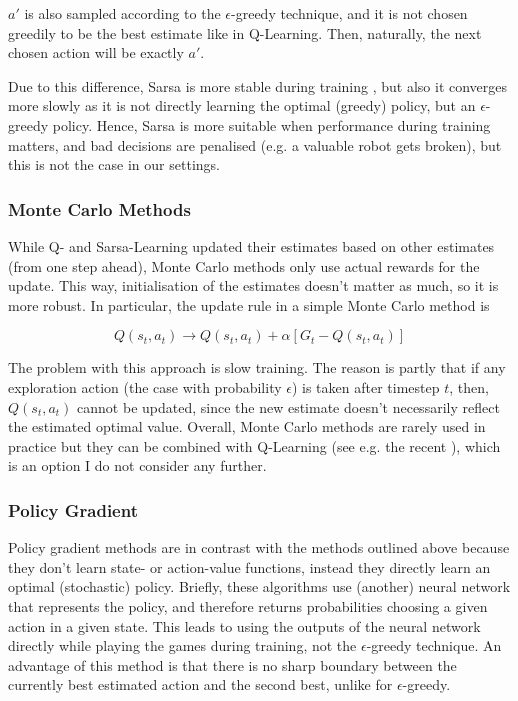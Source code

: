 $a'$ is also sampled according to the $\epsilon$-greedy technique, and it is not chosen greedily to be the best estimate like in Q-Learning. Then, naturally, the next chosen action will be exactly $a'$.

Due to this difference, Sarsa is more stable during training , but also it converges more slowly as it is not directly learning the optimal (greedy) policy, but an $\epsilon$-greedy policy. Hence, Sarsa is more suitable when performance during training matters, and bad decisions are penalised (e.g. a valuable robot gets broken), but this is not the case in our settings.

\subsubsection{Monte Carlo Methods}


While Q- and Sarsa-Learning updated their estimates based on other estimates (from one step ahead), Monte Carlo methods only use actual rewards for the update. This way, initialisation of the estimates doesn't matter as much, so it is more robust. In particular, the update rule in a simple Monte Carlo method is

\begin{equation} \label{eq:monte-carloUpdate}
Q(s_t,a_t) \longrightarrow Q(s_t,a_t) + \alpha[G_t - Q(s_t,a_t)]
\end{equation}

The problem with this approach is slow training. The reason is partly that if any exploration action (the case with probability $\epsilon$) is taken after timestep $t$, then, $Q(s_t,a_t)$ cannot be updated, since the new estimate doesn't necessarily reflect the estimated optimal value. Overall, Monte Carlo methods are rarely used in practice but they can be combined with Q-Learning (see e.g. the recent \cite{wang2018montecarloqlearning}), which is an option I do not consider any further.

\subsubsection{Policy Gradient}

Policy gradient methods are in contrast with the methods outlined above because they don't learn state- or action-value functions, instead they directly learn an optimal (stochastic) policy. Briefly, these algorithms use (another) neural network that represents the policy, and therefore returns probabilities choosing a given action in a given state. This leads to using the outputs of the neural network directly while playing the games during training, not the $\epsilon$-greedy technique. An advantage of this method is that there is no sharp boundary between the currently best estimated action and the second best, unlike for $\epsilon$-greedy. 



